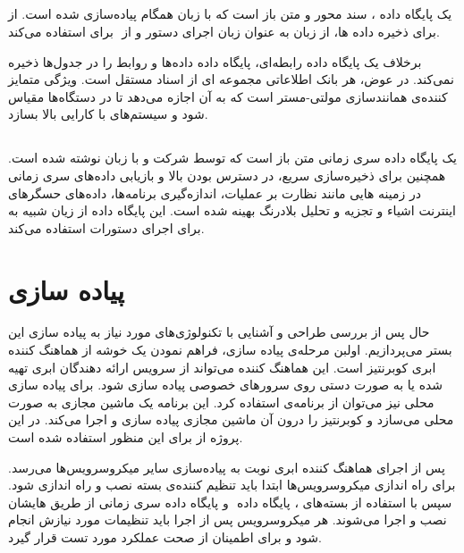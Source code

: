 \subsection{}

 یک پایگاه داده ، سند محور و متن باز است که با زبان همگام  پیاده‌سازی شده است. از  برای ذخیره داده ها، از زبان  به عنوان زبان اجرای دستور و از ‌ برای  استفاده می‌کند.

برخلاف یک پایگاه داده رابطه‌ای، پایگاه داده  داده‌ها و روابط را در جدول‌ها ذخیره نمی‌کند. در عوض، هر بانک اطلاعاتی مجموعه ای از اسناد مستقل است. ویژگی متمایز کننده‌ی  همانند‌سازی ‌مولتی-مستر است که به آن اجازه می‌دهد تا در دستگاه‌ها مقیاس شود و سیستم‌های با کارایی بالا بسازد.

\subsection{}

 یک پایگاه داده سری زمانی متن باز است که توسط شرکت  و با زبان  نوشته شده است. همچنین برای ذخیره‌سازی سریع، در دسترس بودن بالا و بازیابی داده‌های سری زمانی در زمینه هایی مانند نظارت بر عملیات، اندازه‌گیری برنامه‌ها، داده‌های حسگرهای اینترنت اشیاء و تجزیه و تحلیل بلادرنگ بهینه شده است. این پایگاه داده از زیان شبیه به  برای اجرای دستورات استفاده می‌کند.

\section{پیاده سازی}

حال پس از بررسی طراحی و آشنایی با تکنولوژی‌های مورد نیاز به پیاده سازی این بستر می‌پردازیم. اولبن مرحله‌ی پیاده سازی، فراهم نمودن یک خوشه از هماهنگ کننده ابری کوبرنتیز است. این هماهنگ کننده می‌تواند از سرویس‌ ارائه دهندگان ابری تهیه شده یا به صورت دستی روی سرور‌های خصوصی ‌پیاده سازی شود. برای پیاده سازی محلی نیز می‌توان از برنامه‌ی  استفاده کرد. این برنامه یک ماشین مجازی به صورت محلی می‌سازد و کوبرنتیز را درون آن ماشین مجازی پیاده سازی و اجرا می‌کند. در این پروژه از  برای این منظور استفاده شده است.

پس از اجرای هماهنگ کننده ابری نوبت به پیاده‌سازی سایر میکروسرویس‌ها می‌رسد. برای راه اندازی میکروسرویس‌ها ابتدا باید تنظیم کننده‌ی بسته  نصب و راه اندازی شود. سپس با استفاده از  بسته‌های ، پایگاه داده ‌ و پایگاه داده سری زمانی  از طریق  هایشان نصب و اجرا می‌شوند. هر میکروسرویس پس از اجرا باید تنظیمات مورد نیازش انجام شود و برای اطمینان از صحت عملکرد مورد تست قرار گیرد.

